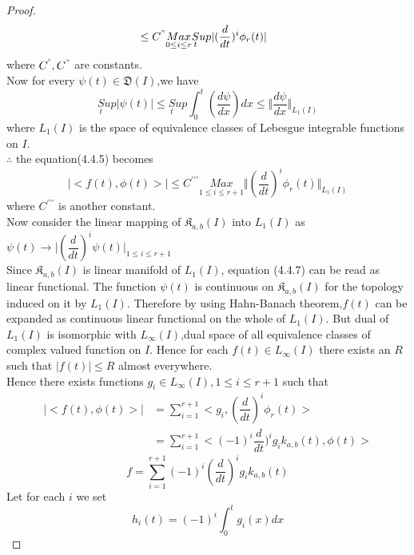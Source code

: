 \begin{proof}
\begin{align}
&\leq C^{"}\underset{0\leq i\leq r}{Max}\underset{t}Sup\vert(\dfrac{d}{dt})^{i}\phi_{r}(t)\vert
\end{align}
where $C^{'},C^{"}$ are constants.\\
 Now for every $\psi(t)\in \mathfrak{D}(I)$,we have
 \begin{equation}
 \underset{t}Sup\vert\psi(t)\vert\leq\underset{t}Sup\int_{0}^{t}(\dfrac{d\psi}{dx})dx
 \leq \Vert\dfrac{d\psi}{dx}\Vert_{L_{1}(I)}
 \end{equation}
where $L_{1}(I)$ is the space of equivalence classes of Lebesgue integrable functions on $I$.\\
$\therefore$ the equation(4.4.5) becomes
\begin{equation}
\vert<f(t),\phi(t)>\vert \leq C^{\prime\prime\prime}\underset{1\leq i\leq r+1}{Max}\Vert(\dfrac{d}{dt})^{i}\phi_{r}(t)\Vert_{L_{1}(I)}
\end{equation}
where $C^{\prime\prime\prime}$ is another constant.\\
Now consider the linear mapping of $\mathfrak{K}_{a,b}(I)$ into $ L_{1}(I) $ as
$\psi(t)\rightarrow \vert(\dfrac{d}{dt})^{i}\psi(t)\vert_{1\leq i \leq r+1}$\\
Since $\mathfrak{K}_{a,b}(I)$ is linear manifold of $ L_{1}(I)$, equation (4.4.7) can be read as linear functional. The function $\psi(t)$ is continuous on $\mathfrak{K}_{a,b}(I)$ for the topology induced on it by $ L_{1}(I) $. Therefore by using Hahn-Banach theorem,$f(t)$ can be expanded as continuous linear functional on the whole of $ L_{1}(I) $. But dual of $L_{1}(I)$ is isomorphic with $L_{\infty}(I)$,dual space of all equivalence classes of complex valued function on $I$. Hence for each $f(t)\in L_{\infty}(I)$ there exists an $R$ such that $\vert f(t)\vert\leq R $ almost everywhere.\\
Hence there exists functions $g_{i}\in L_{\infty}(I), 1\leq i \leq r+1$ such that
\begin{align*}
 \vert<f(t),\phi(t)>\vert&=\sum_{i=1}^{r+1} <g_{i},(\dfrac{d}{dt})^{i}\phi_{r}(t)>\\
& =\sum_{i=1}^{r+1} <(-1)^{i}\dfrac{d}{dt})^{i}g_{i}k_{a,b}(t),\phi(t)>
 \end{align*}
 \begin{equation}
 f=\sum_{i=1}^{r+1}(-1)^{i}(\dfrac{d}{dt})^{i}g_{i}k_{a,b}(t)
 \end{equation}
Let for each $i$ we set
\begin{equation*}
h_{i}(t)=(-1)^{i}\int_{0}^{t}g_{i}(x)dx
\end{equation*}

\end{proof}
